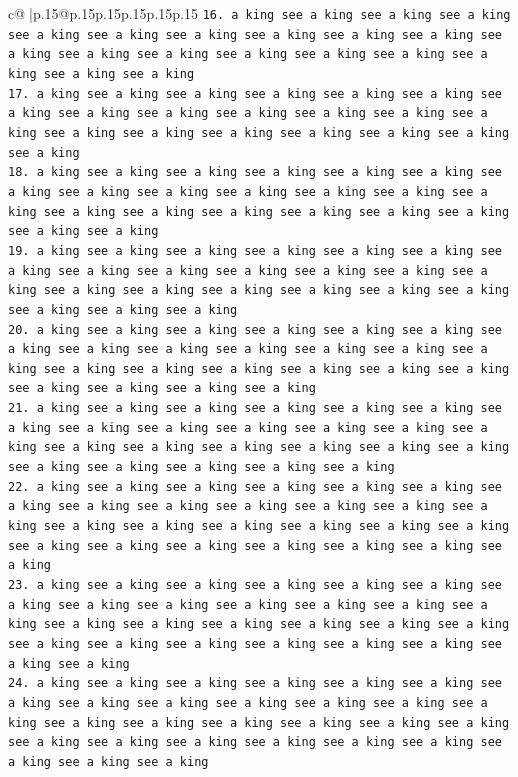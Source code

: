 \documentclass{article}
\begin{document}
{\begin{supertabular}{c@{$\;$}|p{.15\linewidth}@{}p{.15\linewidth}p{.15\linewidth}p{.15\linewidth}p{.15\linewidth}p{.15\linewidth}}
{{{\texttt{16. a king see a king see a king see a king see a king see a king see a king see a king see a king see a king see a king see a king see a king see a king see a king see a king see a king see a king see a king} \\
\texttt{17. a king see a king see a king see a king see a king see a king see a king see a king see a king see a king see a king see a king see a king see a king see a king see a king see a king see a king see a king see a king} \\
\texttt{18. a king see a king see a king see a king see a king see a king see a king see a king see a king see a king see a king see a king see a king see a king see a king see a king see a king see a king see a king see a king see a king} \\
\texttt{19. a king see a king see a king see a king see a king see a king see a king see a king see a king see a king see a king see a king see a king see a king see a king see a king see a king see a king see a king see a king see a king see a king} \\
\texttt{20. a king see a king see a king see a king see a king see a king see a king see a king see a king see a king see a king see a king see a king see a king see a king see a king see a king see a king see a king see a king see a king see a king see a king} \\
\texttt{21. a king see a king see a king see a king see a king see a king see a king see a king see a king see a king see a king see a king see a king see a king see a king see a king see a king see a king see a king see a king see a king see a king see a king see a king} \\
\texttt{22. a king see a king see a king see a king see a king see a king see a king see a king see a king see a king see a king see a king see a king see a king see a king see a king see a king see a king see a king see a king see a king see a king see a king see a king see a king see a king} \\
\texttt{23. a king see a king see a king see a king see a king see a king see a king see a king see a king see a king see a king see a king see a king see a king see a king see a king see a king see a king see a king see a king see a king see a king see a king see a king see a king see a king see a king} \\
\texttt{24. a king see a king see a king see a king see a king see a king see a king see a king see a king see a king see a king see a king see a king see a king see a king see a king see a king see a king see a king see a king see a king see a king see a king see a king see a king see a king see a king see a king} \\
}}}
\end{supertabular}}
\end{document}
